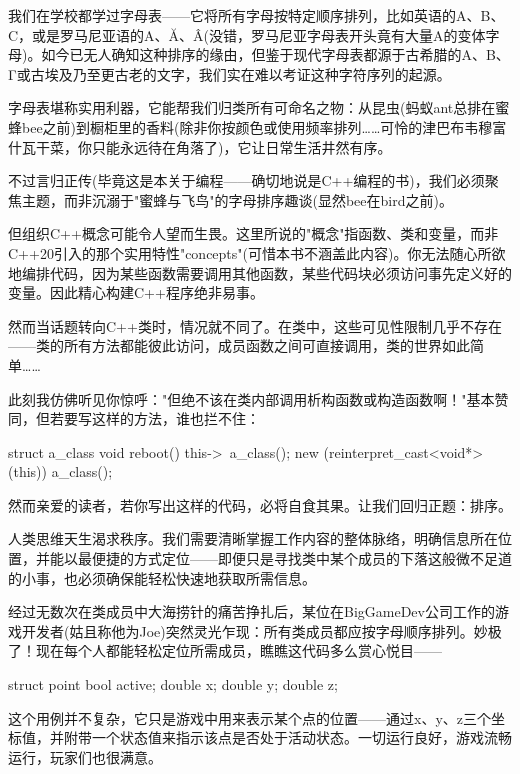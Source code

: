 
我们在学校都学过字母表——它将所有字母按特定顺序排列，比如英语的A、B、C，或是罗马尼亚语的A、Ă、Â(没错，罗马尼亚字母表开头竟有大量A的变体字母)。如今已无人确知这种排序的缘由，但鉴于现代字母表都源于古希腊的Α、Β、Γ或古埃及乃至更古老的文字，我们实在难以考证这种字符序列的起源。

字母表堪称实用利器，它能帮我们归类所有可命名之物：从昆虫(蚂蚁ant总排在蜜蜂bee之前)到橱柜里的香料(除非你按颜色或使用频率排列……可怜的津巴布韦穆富什瓦干菜，你只能永远待在角落了)，它让日常生活井然有序。

不过言归正传(毕竟这是本关于编程——确切地说是C++编程的书)，我们必须聚焦主题，而非沉溺于"蜜蜂与飞鸟"的字母排序趣谈(显然bee在bird之前)。

但组织C++概念可能令人望而生畏。这里所说的"概念"指函数、类和变量，而非C++20引入的那个实用特性"concepts"(可惜本书不涵盖此内容)。你无法随心所欲地编排代码，因为某些函数需要调用其他函数，某些代码块必须访问事先定义好的变量。因此精心构建C++程序绝非易事。

然而当话题转向C++类时，情况就不同了。在类中，这些可见性限制几乎不存在——类的所有方法都能彼此访问，成员函数之间可直接调用，类的世界如此简单……

此刻我仿佛听见你惊呼："但绝不该在类内部调用析构函数或构造函数啊！"基本赞同，但若要写这样的方法，谁也拦不住：

\begin{cpp}
struct a_class {
  void reboot() {
    this->~a_class();
    new (reinterpret_cast<void*>(this)) a_class();
  }
}
\end{cpp}

然而亲爱的读者，若你写出这样的代码，必将自食其果。让我们回归正题：排序。

人类思维天生渴求秩序。我们需要清晰掌握工作内容的整体脉络，明确信息所在位置，并能以最便捷的方式定位——即便只是寻找类中某个成员的下落这般微不足道的小事，也必须确保能轻松快速地获取所需信息。

经过无数次在类成员中大海捞针的痛苦挣扎后，某位在BigGameDev公司工作的游戏开发者(姑且称他为Joe)突然灵光乍现：所有类成员都应按字母顺序排列。妙极了！现在每个人都能轻松定位所需成员，瞧瞧这代码多么赏心悦目——

\begin{cpp}
struct point {
  bool active;
  double x;
  double y;
  double z;
}
\end{cpp}

这个用例并不复杂，它只是游戏中用来表示某个点的位置——通过x、y、z三个坐标值，并附带一个状态值来指示该点是否处于活动状态。一切运行良好，游戏流畅运行，玩家们也很满意。

